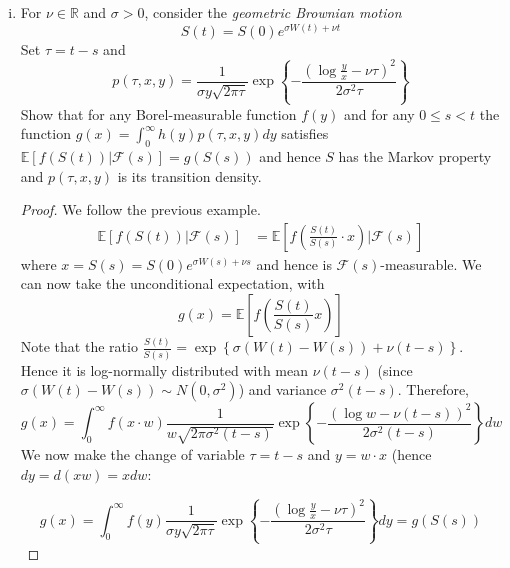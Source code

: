 \documentclass{article}
\newcommand{\R}{\mathbb{R}}
\newcommand{\E}{\mathbb{E}}
\newcommand{\F}{\mathcal{F}}
\newcommand{\seq}[1]{\left\{ #1 \right\}}
\theoremstyle{definition}
\theoremstyle{definition}
\begin{document}
\begin{enumerate}
\begin{enumerate}[(i)]
        \item For $\nu \in \R$ and $\sigma > 0$, consider the \textit{geometric Brownian motion}
        $$ S(t) = S(0) e^{\sigma W(t)+\nu t}$$
        Set $\tau = t-s$ and
        $$ p(\tau,x,y) = \frac{1}{\sigma y\sqrt{2\pi \tau}}\exp \seq{-\frac{(\log\frac{y}{x}-\nu\tau)^2}{2\sigma^2\tau}}$$ 
        Show that for any Borel-measurable function $f(y)$ and for any $0 \le s < t$ the function $g(x)=\int_0^\infty h(y)p(\tau,x,y)dy$ satisfies $\E[f(S(t))|\F(s)] = g(S(s))$ and hence $S$ has the Markov property and $p(\tau,x,y)$ is its transition density.
        \begin{proof} We follow the previous example.
        \begin{align*} \E[f(S(t))|\F(s)] &= \E[f\left( \frac{S(t)}{S(s)}\cdot x \right)|\F(s)] 
        \end{align*}
        where $x=S(s)=S(0)e^{\sigma W(s)+\nu s}$ and hence is $\F(s)$-measurable. We can now take the unconditional expectation, with
        $$g(x) = \E\left[f\left( \frac{S(t)}{S(s)}x \right)\right]$$
        Note that the ratio $\frac{S(t)}{S(s)} = \exp \seq{ \sigma(W(t)-W(s))+\nu(t-s)}$. Hence it is log-normally distributed with mean $\nu(t-s)$ (since $\sigma(W(t)-W(s))\sim N(0,\sigma^2)$) and variance $\sigma^2(t-s)$. Therefore,
       $$ g(x) =  \int_0^\infty f(x \cdot w)  \frac{1}{w\sqrt{2\pi \sigma^2 (t-s)}} \exp\seq{-\frac{(\log w-\nu(t-s))^2}{2 \sigma^2(t-s)}}dw$$
       We now make the change of variable $\tau = t-s$ and $y = w \cdot x$ (hence $dy = d(xw) = x dw$:
       
       $$ g(x) =  \int_0^\infty f(y)  \frac{1}{\sigma y\sqrt{ 2\pi \tau}} \exp\seq{-\frac{(\log \frac{y}{x}-\nu\tau)^2}{2 \sigma^2\tau}}dy=g(S(s))$$
        \end{proof}
        
    \end{enumerate}
\end{enumerate}
\end{document}
